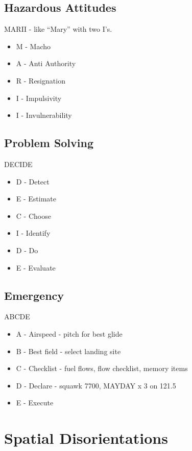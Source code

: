 \subsection{Hazardous Attitudes}

MARII - like ``Mary'' with two I's.

\begin{itemize}
    \item M - Macho
    \item A - Anti Authority
    \item R - Resignation
    \item I - Impulsivity
    \item I - Invulnerability
\end{itemize}

\subsection{Problem Solving}

DECIDE

\begin{itemize}
    \item D - Detect
    \item E - Estimate 
    \item C - Choose
    \item I - Identify
    \item D - Do
    \item E - Evaluate
\end{itemize}

\subsection{Emergency}

ABCDE

\begin{itemize}
    \item A - Airspeed - pitch for best glide
    \item B - Best field - select landing site
    \item C - Checklist - fuel flows, flow checklist, memory items
    \item D - Declare - squawk 7700, MAYDAY x 3 on 121.5
    \item E - Execute
\end{itemize}

\section{Spatial Disorientations}

